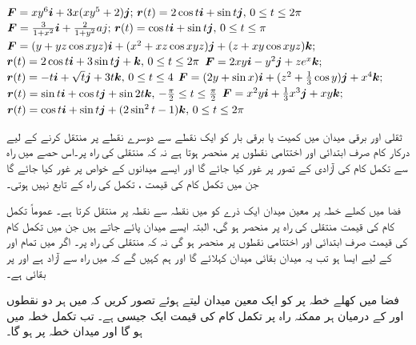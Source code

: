 \({{\boldsymbol{F}}}=xy^6{\boldsymbol{i}}+3x(xy^5+2){\boldsymbol{j}};\, {{\boldsymbol{r}}}(t)=2\cos t{\boldsymbol{i}}+\sin t{\boldsymbol{j}},\, 0\le t\le 2\pi\)
\({{\boldsymbol{F}}}=\tfrac{3}{1+x^2}{\boldsymbol{i}}+\tfrac{2}{1+y^2}aj;\, {{\boldsymbol{r}}}(t)=\cos t{\boldsymbol{i}}+\sin t{\boldsymbol{j}},\, 0\le t\le \pi\)
\({{\boldsymbol{F}}}=(y+yz\cos xyz){\boldsymbol{i}}+(x^2+xz\cos xyz){\boldsymbol{j}}+(z+xy\cos xyz){\boldsymbol{k}};\)\\
\( {{\boldsymbol{r}}}(t)=2\cos t{\boldsymbol{i}}+3\sin t{\boldsymbol{j}}+{\boldsymbol{k}},\, 0\le t\le 2\pi\)
\({{\boldsymbol{F}}}=2xy{\boldsymbol{i}}-y^2{\boldsymbol{j}}+ze^x{\boldsymbol{k}};\)\\
\( {{\boldsymbol{r}}}(t)=-t{\boldsymbol{i}}+\sqrt{t}{\boldsymbol{j}}+3t{\boldsymbol{k}},\, 0\le t\le 4\)
\({{\boldsymbol{F}}}=(2y+\sin x){\boldsymbol{i}}+(z^2+\tfrac{1}{3}\cos y){\boldsymbol{j}}+x^4{\boldsymbol{k}};\)\\
\( {{\boldsymbol{r}}}(t)=\sin t {\boldsymbol{i}}+\cos t{\boldsymbol{j}}+\sin 2t{\boldsymbol{k}},\, -\tfrac{\pi}{2}\le t\le \tfrac{\pi}{2}\)
\({{\boldsymbol{F}}}=x^2y{\boldsymbol{i}}+\tfrac{1}{3}x^3{\boldsymbol{j}}+xy{\boldsymbol{k}};\)\\
\( {{\boldsymbol{r}}}(t)=\cos t{\boldsymbol{i}}+\sin t{\boldsymbol{j}}+(2\sin^2 t-1){\boldsymbol{k}},\, 0\le t\le 2\pi\)



ثقلی اور برقی میدان میں کمیت یا برقی  بار کو ایک نقطے  سے دوسرے نقطے پر  منتقل کرنے کے لیے درکار کام صرف ابتدائی اور اختتامی نقطوں پر منحصر ہوتا ہے نہ کہ منتقلی کی راہ پر۔اس حصے میں  راہ سے تکمل کام کی  آزادی کے تصور پر غور کیا جائے گا اور ایسے میدانوں کے خواص پر غور کیا جائے گا جن میں تکمل کام کی قیمت ، تکمل کی راہ کے  تابع نہیں ہوتی۔

فضا میں کھلے خطہ  پر معین میدان  ایک ذرے  کو  میں  نقطہ  سے نقطہ  پر  منتقل کرتا ہے۔ عموماً   تکمل کام  کی قیمت منتقلی کی راہ پر منحصر ہو گی، البتہ ایسے میدان پائے جاتے ہیں جن میں تکمل کام کی قیمت صرف ابتدائی اور اختتامی نقطوں پر منحصر ہو گی نہ  کہ منتقلی کی راہ پر۔ اگر  میں تمام  اور  کے لیے ایسا ہو تب یہ میدان بقائی میدان کہلائے گا اور ہم کہیں گے کہ  میں  راہ سے آزاد ہے اور  پر  بقائی ہے۔

فضا میں کھلے خطہ  پر  کو ایک  معین میدان لیتے ہوئے تصور کریں کہ  میں ہر دو نقطوں  اور  کے درمیان ہر ممکنہ راہ پر تکمل کام  کی قیمت ایک جیسی ہے۔ تب تکمل  خطہ  میں  ہو گا اور میدان  خطہ  پر  ہو گا۔

